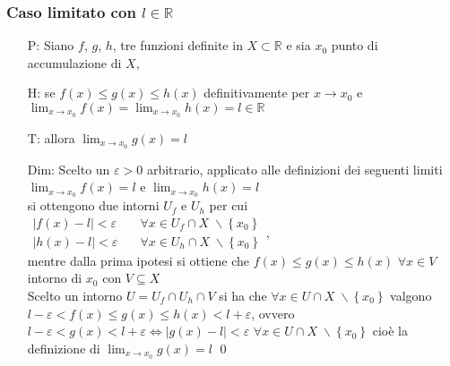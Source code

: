 \documentclass[a4paper]{article}
\begin{document}
\subsubsection*{Caso limitato con \(l \in \mathbb{R}\)}
\begin{itemize}
	\item[P:] Siano \(f\), \(g\), \(h\), tre funzioni definite in \(X \subset \mathbb{R}\) e sia \(x_0\) punto di accumulazione di \(X\),
	\item[H:] se \(f(x) \leq g(x) \leq h(x)\) definitivamente per \(x \to x_0\) e \(\displaystyle \lim_{x \to x_0} f(x) = \lim_{x \to x_0} h(x) = l \in \mathbb{R}\)
	\item[T:] allora \(\displaystyle \lim_{x \to x_0} g(x) = l\)
	\item[Dim:] Scelto un \(\varepsilon > 0\) arbitrario, applicato alle definizioni dei seguenti limiti \(\displaystyle \lim_{x \to x_0} f(x) = l\) e \(\displaystyle \lim_{x \to x_0} h(x) = l\) \\
	si ottengono due intorni \(U_f\) e \(U_h\) per cui \(\begin{aligned}
		\left| f(x) - l \right| < \varepsilon \quad &\forall x \in U_f \cap X \; \backslash \left\{ x_0 \right\} \\
		\left| h(x) - l \right| < \varepsilon \quad &\forall x \in U_h \cap X \; \backslash \left\{ x_0 \right\}
	\end{aligned}\), \\ 
	mentre dalla prima ipotesi si ottiene che \(f(x) \leq g(x) \leq h(x)\) \(\forall x \in V\) intorno di \(x_0\) con \(V \subseteq X\) \\
	Scelto un intorno \(U = U_f \cap U_h \cap V\) si ha che \(\forall x \in U \cap X \; \backslash \left\{ x_0 \right\}\) valgono \\
	\(l - \varepsilon < f(x) \leq g(x) \leq h(x) < l + \varepsilon\), ovvero \(l - \varepsilon < g(x) < l + \varepsilon \Leftrightarrow \left| g(x) - l \right| < \varepsilon\) \(\forall x \in U \cap X \; \backslash \left\{ x_0 \right\}\)
	cioè la definizione di \(\displaystyle \lim_{x \to x_0} g(x) = l\) \qed
\end{itemize}
\end{document}
